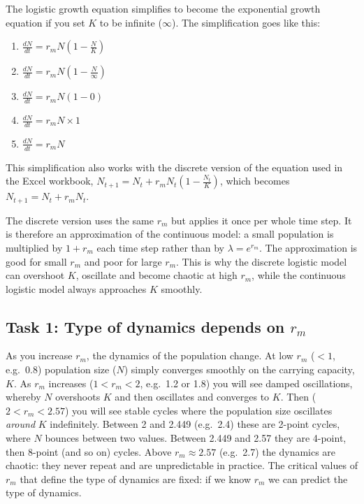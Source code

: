 \documentclass[
  a4paper]{book}
\providecommand{\tightlist}{%
  \setlength{\itemsep}{0pt}\setlength{\parskip}{0pt}}
\begin{document}
The logistic growth equation simplifies to become the exponential growth equation if you set \(K\) to be infinite (\(\infty\)). The simplification goes like this:

\begin{enumerate}
\def\labelenumi{\arabic{enumi}.}
\tightlist
\item
  \(\frac{dN}{dt}=r_m N\left(1-\frac{N}{K}\right)\)
\item
  \(\frac{dN}{dt}=r_m N\left(1-\frac{N}{\infty}\right)\)
\item
  \(\frac{dN}{dt}=r_m N\left(1-0\right)\)
\item
  \(\frac{dN}{dt}=r_m N \times 1\)
\item
  \(\frac{dN}{dt}=r_m N\)
\end{enumerate}

This simplification also works with the discrete version of the equation used in the Excel workbook, \(N_{t+1}=N_{t}+r_{m} N_{t}\left(1-\frac{N_{t}}{K}\right)\), which becomes \(N_{t+1}=N_{t}+r_{m} N_{t}\).

The discrete version uses the same \(r_m\) but applies it once per whole time step. It is therefore an approximation of the continuous model: a small population is multiplied by \(1 + r_m\) each time step rather than by \(\lambda = e^{r_m}\). The approximation is good for small \(r_m\) and poor for large \(r_m\). This is why the discrete logistic model can overshoot \(K\), oscillate and become chaotic at high \(r_m\), while the continuous logistic model always approaches \(K\) smoothly.

\subsection{\texorpdfstring{Task 1: Type of dynamics depends on \(r_m\)}{Task 1: Type of dynamics depends on r\_m}}\label{task-1-type-of-dynamics-depends-on-r_m}

As you increase \(r_m\), the dynamics of the population change. At low \(r_m\) (\(< 1\), e.g.~0.8) population size (\(N\)) simply converges smoothly on the carrying capacity, \(K\). As \(r_m\) increases (\(1 < r_m < 2\), e.g.~1.2 or 1.8) you will see damped oscillations, whereby \(N\) overshoots \(K\) and then oscillates and converges to \(K\). Then (\(2 < r_m < 2.57\)) you will see stable cycles where the population size oscillates \emph{around} \(K\) indefinitely. Between 2 and 2.449 (e.g.~2.4) these are 2-point cycles, where \(N\) bounces between two values. Between 2.449 and 2.57 they are 4-point, then 8-point (and so on) cycles. Above \(r_m \approx 2.57\) (e.g.~2.7) the dynamics are chaotic: they never repeat and are unpredictable in practice. The critical values of \(r_m\) that define the type of dynamics are fixed: if we know \(r_m\) we can predict the type of dynamics.
\end{document}
